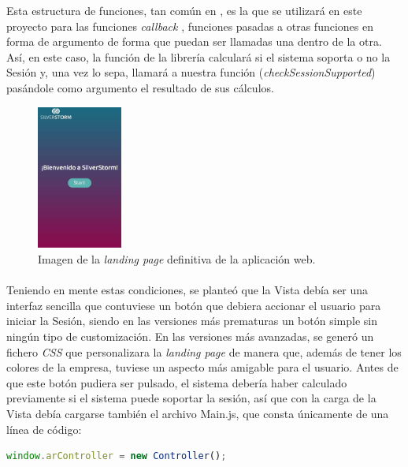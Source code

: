 \documentclass{subfiles}
\begin{document}
        Esta estructura de funciones, tan común en \js, es la que se utilizará en este proyecto para las funciones \textit{callback} \cite{web:callbackfunction}, funciones pasadas a otras funciones en forma de argumento de forma que puedan ser llamadas una dentro de la otra. Así, en este caso, la función de la librería calculará si el sistema soporta o no la Sesión y, una vez lo sepa, llamará a nuestra función (\textit{checkSessionSupported}) pasándole como argumento el resultado de sus cálculos.

        \begin{figure}
        \centering
        \includegraphics[width=0.25\textwidth]{img/landing_page.jpg}
        \caption{Imagen de la \textit{landing page} definitiva de la aplicación web.}
        \label{fig:landing_page}
        \end{figure}

        \paragraph{}
        Teniendo en mente estas condiciones, se planteó que la Vista debía ser una interfaz sencilla que contuviese un botón que debiera accionar el usuario para iniciar la Sesión, siendo en las versiones más prematuras un botón simple sin ningún tipo de customización. En las versiones más avanzadas, se generó un fichero \textit{CSS} que personalizara la \textit{landing page} de manera que, además de tener los colores de la empresa, tuviese un aspecto más amigable para el usuario. Antes de que este botón pudiera ser pulsado, el sistema debería haber calculado previamente si el sistema puede soportar la sesión, así que con la carga de la Vista debía cargarse también el archivo Main.js, que consta únicamente de una línea de código:

\begin{lstlisting}[language=JavaScript, caption={Inicialización del Controlador.}, label={lst:2.3}]
window.arController = new Controller();
\end{lstlisting}
\end{document}
